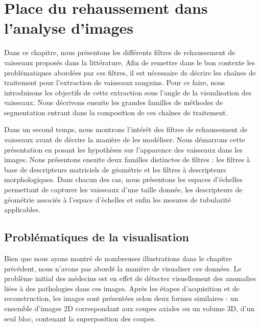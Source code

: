 %
\chapter{Place du rehaussement dans l'analyse d'images}
\label{sec:SOTA}
Dans ce chapitre, nous présentons les différents filtres de rehaussement de vaisseaux proposés dans la littérature. Afin de remettre dans le bon contexte les problématiques abordées par ces filtres, il est nécessaire de décrire les chaînes de traitement pour l'extraction de vaisseaux sanguins. Pour ce faire, nous introduisons les objectifs de cette extraction sous l'angle de la visualisation des vaisseaux. Nous décrivons ensuite les grandes familles de méthodes de segmentation entrant dans la composition de ces chaînes de traitement.

Dans un second temps, nous montrons l'intérêt des filtres de rehaussement de vaisseaux avant de décrire la manière de les modéliser. Nous démarrons cette présentation en posant les hypothèses sur l'apparence des vaisseaux dans les images. Nous présentons ensuite deux familles distinctes de filtres : les filtres à base de descripteurs matriciels de géométrie et les filtres à descripteurs morphologiques. Dans chacun des cas, nous présentons les espaces d'échelles permettant de capturer les vaisseaux d'une taille donnée, les descripteurs de géométrie associés à l'espace d'échelles et enfin les mesures de tubularité applicables.
\section{Problématiques de la visualisation}

    Bien que nous ayons montré de nombreuses illustrations dans le chapitre précédent, nous n'avons pas abordé la manière de visualiser ces données.
    Le problème initial des médecins est en effet de détecter visuellement des anomalies liées à des pathologies dans ces images. Après les étapes d'acquisition et de reconstruction, les images sont présentées selon deux formes similaires : un ensemble d'images 2D correspondant aux coupes axiales ou un volume 3D, d'un seul bloc, contenant la superposition des coupes.
    
